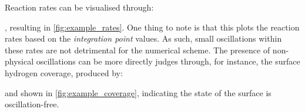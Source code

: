 \documentclass[3p]{elsarticle} %
\begin{document}
Reaction rates can be visualised through:

, resulting in \cref{fig:example_rates}. One thing to note is that this plots the reaction rates based on the \textit{integration point} values. As such, small oscillations within these rates are not detrimental for the numerical scheme. The presence of non-physical oscillations can be more directly judges through, for instance, the surface hydrogen coverage, produced by:

 and shown in \cref{fig:example_coverage}, indicating the state of the surface is oscillation-free.
\end{document}
